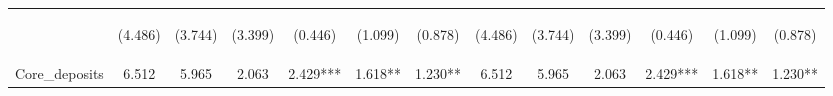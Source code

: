 \documentclass[]{article}
\begin{document}
\begin{center}
\begin{tabular}{lcccccccccccc}
\vspace{4pt} & \begin{footnotesize}(4.486)\end{footnotesize} & \begin{footnotesize}(3.744)\end{footnotesize} & \begin{footnotesize}(3.399)\end{footnotesize} & \begin{footnotesize}(0.446)\end{footnotesize} & \begin{footnotesize}(1.099)\end{footnotesize} & \begin{footnotesize}(0.878)\end{footnotesize} & \begin{footnotesize}(4.486)\end{footnotesize} & \begin{footnotesize}(3.744)\end{footnotesize} & \begin{footnotesize}(3.399)\end{footnotesize} & \begin{footnotesize}(0.446)\end{footnotesize} & \begin{footnotesize}(1.099)\end{footnotesize} & \begin{footnotesize}(0.878)\end{footnotesize} \\
Core\_deposits & 6.512 & 5.965 & 2.063 & 2.429*** & 1.618** & 1.230** & 6.512 & 5.965 & 2.063 & 2.429*** & 1.618** & 1.230** \\

\end{tabular}
\end{center}
\end{document}
